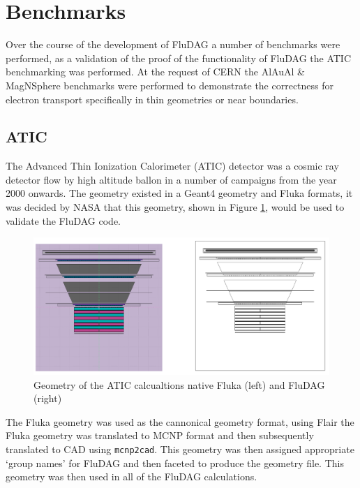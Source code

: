 \clearpage
\section{Benchmarks}
Over the course of the development of FluDAG a number of benchmarks were
performed, as a validation of the proof of the functionality of FluDAG the ATIC
benchmarking was performed. At the request of CERN the AlAuAl \& MagNSphere
benchmarks were performed to demonstrate the correctness for electron transport
specifically in thin geometries or near boundaries.
\label{sec:benchmarking}
\subsection{ATIC}
The Advanced Thin Ionization Calorimeter (ATIC) detector was a cosmic ray
detector flow by high altitude ballon in a number of campaigns from the year
2000 onwards. The geometry existed in a Geant4 geometry and Fluka formats, it
was decided by NASA that this geometry, shown in Figure \ref{fig:atic_geom},
would be used to validate the FluDAG code.
\begin{figure}[ht!]
 \begin{centering}
 \includegraphics[width=0.7\paperwidth]{../figs/atic_geom.png}
 \caption{Geometry of the ATIC calcualtions native Fluka (left) and FluDAG (right)}
 \label{fig:atic_geom}
 \end{centering}
\end{figure}
The Fluka geometry was used as the cannonical geometry format, using Flair the
Fluka geometry was translated to MCNP format and then subsequently translated to
CAD using \texttt{mcnp2cad}. This geometry was then assigned appropriate `group
 names' for FluDAG and then faceted to produce the geometry file. This geometry
 was then used in all of the FluDAG calculations. 
\clearpage
